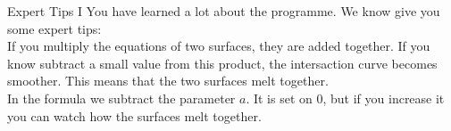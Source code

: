 \begin{surferPage}{Expert Tips I}
You have learned a lot about the programme. We know give you some expert tips:\\
\vspace{0.3cm}
If you multiply the equations of two surfaces, they are added together. If you know subtract a small value from this product, the intersaction curve becomes smoother. This means that the two surfaces melt together.\\
\vspace{0.3cm}
In the formula we subtract the parameter $a$. It is set on 0, but if you increase it you can watch how the surfaces melt together.
\end{surferPage}
